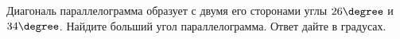 \begin{ex}
	\begin{condition}
		Диагональ параллелограмма образует с двумя его сторонами углы \( 26 \degree \) и \( 34 \degree \). Найдите больший угол параллелограмма. Ответ дайте в градусах.
	\end{condition}
\end{ex}